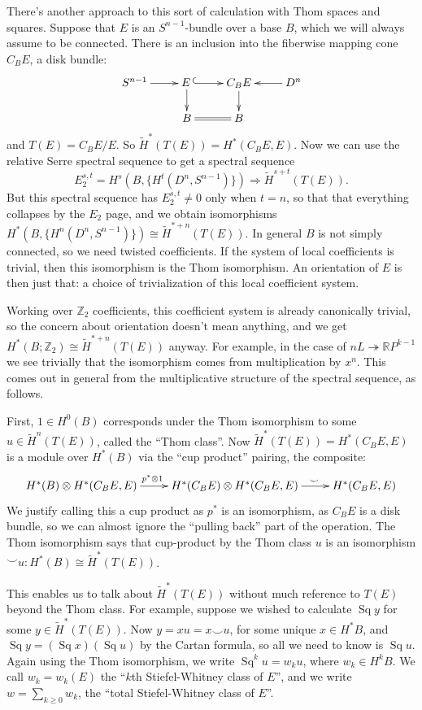 \documentclass{article}
\newcommand{\Z}{\mathbb{Z}}
\newcommand{\R}{\mathbb{R}}
\newcommand{\RP}{\R P}
\newcommand{\onto}{\twoheadrightarrow}
\DeclareMathOperator{\Sq}{Sq}
\theoremstyle{definition}
\begin{document}
There's another approach to this sort of calculation with Thom spaces and squares.  Suppose that $E$ is an $S^{n-1}$-bundle over a base $B$, which we will always assume to be connected. There is an inclusion into the fiberwise mapping cone $C_B E$, a disk bundle:
\[\xymatrix@R=.6cm{
S^{n-1}\ar[r]&E\,\ar@{^{(}->}[r]\ar[d]&C_BE\ar[d]&D^n\ar[l]\\
&B\ar@{=}[r]&B
}\]
and $T(E) = C_B E / E$.  So $\widetilde H^* (T(E)) = H^*(C_B E, E)$.  Now we can use the relative Serre spectral sequence to get a spectral sequence
\[
E_2^{s,t}=H^s(B, \{H^t(D^n, S^{n-1})\}) \Rightarrow \widetilde H^{s+t}( T(E))
.\]
But this spectral sequence has $E_2^{s,t}\neq0$ only when $t=n$, so that that everything collapses by the $E_2$ page, and we obtain isomorphisms $H^*(B, \{H^n(D^n, S^{n-1})\}) \cong \widetilde H^{*+n} (T(E))$.  In general $B$ is not simply connected, so we need twisted coefficients.  If the system of local coefficients is trivial, then this isomorphism is the Thom isomorphism.  An orientation of $E$ is then just that: a choice of trivialization of this local coefficient system.

Working over $\Z_2$ coefficients, this coefficient system is already canonically trivial, so the concern about orientation doesn't mean anything, and we get $H^*(B; \Z_2) \cong \widetilde H^{*+n} (T(E))$ anyway.  For example, in the case of $nL \onto \RP^{k-1}$ we see trivially that the isomorphism comes from multiplication by $x^n$.  This comes out in general from the multiplicative structure of the spectral sequence, as follows.

First, $1\in H^0 (B)$ corresponds under the Thom isomorphism to some $u \in \widetilde H^n (T(E))$, called the ``Thom class''.  Now $\widetilde H^* (T(E)) = H^*(C_B E, E)$ is a module over $H^* (B)$ via the ``cup product'' pairing, the composite:
\[\xymatrix{
H^*(B) \otimes H^*(C_B E, E)\ar[r]^{p^*\otimes1\ \ \ }&H^*(C_B E) \otimes H^*(C_B E, E)\ar[r]^{\hspace{9mm}\smile}& H^*(C_B E, E)
}\]
We justify calling this a cup product as $p^*$ is an isomorphism, as $C_BE$ is a disk bundle, so we can almost ignore the ``pulling back'' part of the operation. The Thom isomorphism says that cup-product by the Thom class $u$ is an isomorphism $\smile u: H^* (B) \cong \widetilde H^* (T(E))$.

This enables us to talk about $\widetilde H^* (T(E))$ without much reference to $T(E)$ beyond the Thom class.  For example, suppose we wished to calculate $\Sq y$ for some $y\in \widetilde H^*( T(E))$. Now $y=xu = x \smile u$, for some unique $x \in H^* B$, and $\Sq y = (\Sq x)(\Sq u)$ by the Cartan formula, so all we need to know is $\Sq u$.  Again using the Thom isomorphism, we write $\Sq^k u = w_k u$, where $w_k \in H^k B$. We call $w_k = w_k(E)$ the ``$k$th Stiefel-Whitney class of $E$'', and we write $w = \sum_{k \ge 0} w_k$, the ``total Stiefel-Whitney class of $E$''.
\end{document}
